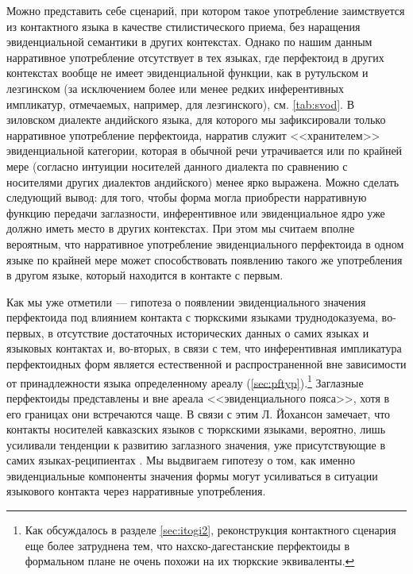 \par Можно представить себе сценарий, при котором такое употребление заимствуется из контактного языка в качестве стилистического приема, без наращения эвиденциальной семантики в других контекстах. Однако по нашим данным нарративное употребление отсутствует в тех языках, где перфектоид в других контекстах вообще не имеет эвиденциальной функции, как в рутульском и лезгинском (за исключением более или менее редких инферентивных импликатур, отмечаемых, например, для лезгинского), см. \ref{tab:svod}. В зиловском диалекте андийского языка, для которого мы зафиксировали только нарративное употребление перфектоида, нарратив служит <<хранителем>> эвиденциальной категории, которая в обычной речи утрачивается или по крайней мере (согласно интуиции носителей данного диалекта по сравнению с носителями других диалектов андийского) менее ярко выражена. Можно сделать следующий вывод: для того, чтобы форма могла приобрести нарративную функцию передачи заглазности, инферентивное или эвиденциальное ядро уже должно иметь место в других контекстах. При этом мы считаем вполне вероятным, что нарративное употребление эвиденциального перфектоида в одном языке по крайней мере может способствовать появлению такого же употребления в другом языке, который находится в контакте с первым.
\par Как мы уже отметили --- гипотеза о появлении эвиденциального значения перфектоида под влиянием контакта с тюркскими языками труднодоказуема, во-первых, в отсутствие достаточных исторических данных о самих языках и языковых контактах и, во-вторых, в связи с тем, что инферентивная импликатура перфектоидных форм является естественной и распространенной вне зависимости от принадлежности языка определенному ареалу (\ref{sec:pftyp}).\footnote{Как обсуждалось в разделе \ref{sec:itogi2}, реконструкция контактного сценария еще более затруднена тем, что нахско-дагестанские перфектоиды в формальном плане не очень похожи на их тюркские эквиваленты.} Заглазные перфектоиды представлены и вне ареала <<эвиденциального пояса>>, хотя в его границах они встречаются чаще. В связи с этим Л. Йохансон замечает, что контакты носителей кавказских языков с тюркскими языками, вероятно, лишь усиливали тенденции к развитию заглазного значения, уже присутствующие в самих языках-реципиентах \citep[172]{johanson2006}. Мы выдвигаем гипотезу о том, как  именно эвиденциальные компоненты значения формы могут усиливаться в ситуации языкового контакта через нарративные употребления.
